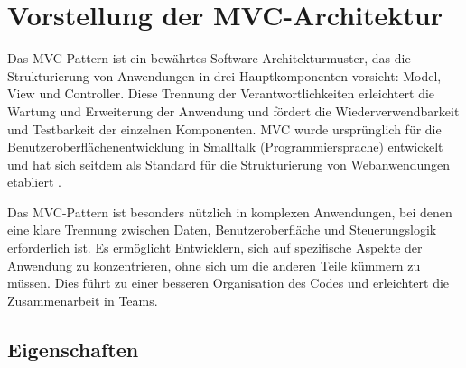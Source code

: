 
\chapter{Vorstellung der MVC-Architektur}
\label{chap:vorstellung}

Das \ac{MVC} Pattern ist ein bewährtes Software-Architekturmuster, das die Strukturierung von Anwendungen in drei Hauptkomponenten vorsieht: Model, View und Controller. Diese Trennung der Verantwortlichkeiten erleichtert die Wartung und Erweiterung der Anwendung und fördert die Wiederverwendbarkeit und Testbarkeit der einzelnen Komponenten. \ac{MVC} wurde ursprünglich für die Benutzeroberflächenentwicklung in Smalltalk (Programmiersprache) entwickelt und hat sich seitdem als Standard für die Strukturierung von Webanwendungen etabliert \cite{delessy2012securemvc}.

Das \ac{MVC}-Pattern ist besonders nützlich in komplexen Anwendungen, bei denen eine klare Trennung zwischen Daten, Benutzeroberfläche und Steuerungslogik erforderlich ist. Es ermöglicht Entwicklern, sich auf spezifische Aspekte der Anwendung zu konzentrieren, ohne sich um die anderen Teile kümmern zu müssen. Dies führt zu einer besseren Organisation des Codes und erleichtert die Zusammenarbeit in Teams.


\section{Eigenschaften}

